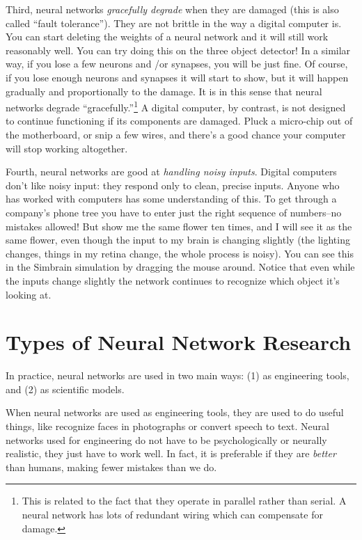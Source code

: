Third, neural networks \emph{gracefully degrade} when they are damaged (this is also called ``fault tolerance''). They are not brittle in the way a digital computer is. You can start deleting the weights of a neural network and it will still work reasonably well. You can try doing this on the three object detector!   In a  similar way, if you lose a few neurons and /or synapses, you will be just fine. Of course, if you lose enough neurons and synapses it will start to show, but it will happen gradually and  proportionally to the damage. It is in this sense that neural networks degrade ``gracefully.''\footnote{This is related to the fact that they operate in parallel rather than serial. A neural network has lots of redundant wiring which can compensate for damage.}  A digital computer, by contrast, is not designed to continue functioning if its components are damaged. Pluck a micro-chip out of the motherboard, or snip a few wires, and there's a good chance your computer will stop working altogether. 

Fourth, neural networks are good at \emph{handling noisy inputs}. Digital computers don't like noisy input: they respond only to clean, precise inputs. Anyone who has worked with computers has some understanding of this. To get through a company's phone tree you have to enter just the right sequence of numbers--no mistakes allowed!  But show me the same flower ten times, and I will see it as the same flower, even though the input to my brain is changing slightly (the lighting changes, things in my retina change, the whole process is noisy). You can see this in the Simbrain simulation by dragging the mouse around. Notice that even while the inputs change slightly the network continues to recognize which object it's looking at.

\section{Types of Neural Network Research}\label{typesOfResearch}

In practice, neural networks are used in two main ways: (1) as engineering tools, and (2) as scientific models.

When neural networks are used as engineering tools, they are used to do useful things, like recognize faces in photographs or convert speech to text. Neural networks used for engineering do not have to be psychologically or neurally realistic, they just have to work well. In fact, it is preferable if they are \emph{better} than humans, making fewer mistakes than we do.

